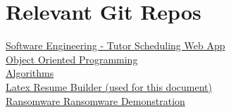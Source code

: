 \begin{minipage}[t]{0.5\textwidth}
    \section*{Relevant Git Repos}
    \begin{small}
        \href{https://github.com/kcverbrugge/tlc-scheduling-app}{Software Engineering - Tutor Scheduling Web App}\\
        \href{https://github.com/kcverbrugge/CSCI375-OOP}{Object Oriented Programming}\\
        \href{https://github.com/kcverbrugge/CSCI250-Algorithms}{Algorithms}\\
        \href{https://github.com/kcverbrugge/ResumeBuilder}{Latex Resume Builder (used for this document)}\\
        \href{https://github.com/kcverbrugge/RansomwareDemonstration}{Ransomware Ransomware Demonstration}
    \end{small}
\end{minipage}